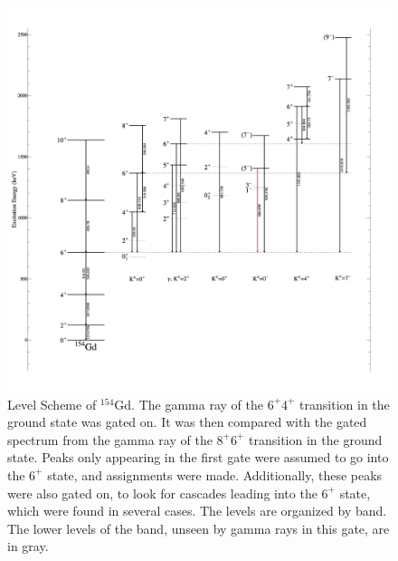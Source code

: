 \begin{figure}
    \centering
    \includegraphics[scale=0.2]{154GdTablesAndFigs/154Gd_6to4.png}
    \caption{Level Scheme of $^{154}$Gd. The gamma ray of the $6^+$\rightarrow$4^+$ transition in the ground state was gated on. It was then compared with the gated spectrum from the gamma ray of the $8^+$\rightarrow$6^+$ transition in the ground state. Peaks only appearing in the first gate were assumed to go into the $6^+$ state, and assignments were made. Additionally, these peaks were also gated on, to look for cascades leading into the $6^+$ state, which were found in several cases. The levels are organized by band. The lower levels of the band, unseen by gamma rays in this gate, are in gray.}
    \label{fig:154_6to4}
\end{figure}

